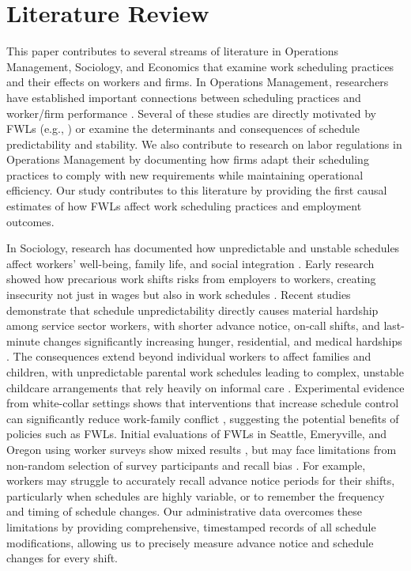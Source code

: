 \documentclass[letterpaper,11pt,leqno]{article}
\theoremstyle{paper}
\begin{document}
\section{Literature Review} \label{sec:literature_review}
This paper contributes to several streams of literature in Operations Management, Sociology, and Economics that examine work scheduling practices and their effects on workers and firms. In Operations Management, researchers have established important connections between scheduling practices and worker/firm performance \citep{fisher_2021, netessine_traffic, kesavan_traffic, call_of_duty_2021, du_scheduling, fisher_raman_2010, kwon2024employee, kwon_hci, retailAIScheduling2025, kwon2025inputinaccuracy, kwon2023inconsistentschedules}. Several of these studies are directly motivated by FWLs (e.g., \cite{du_scheduling}) or examine the determinants and consequences of schedule predictability and stability. We also contribute to research on labor regulations in Operations Management \citep{Asadpour2022MinimumEarnings, KwonWu2021Disclosure, Lu2017DoMandatory, min_wage_yiu} by documenting how firms adapt their scheduling practices to comply with new requirements while maintaining operational efficiency. Our study contributes to this literature by providing the first causal estimates of how FWLs affect work scheduling practices and employment outcomes.

In Sociology, research has documented how unpredictable and unstable schedules affect workers' well-being, family life, and social integration \citep{kalleberg2009precarious,schneider2019consequences}. Early research showed how precarious work shifts risks from employers to workers, creating insecurity not just in wages but also in work schedules \citep{kalleberg2000nonstandard}. Recent studies demonstrate that schedule unpredictability directly causes material hardship among service sector workers, with shorter advance notice, on-call shifts, and last-minute changes significantly increasing hunger, residential, and medical hardships \citep{schneider2021hard}. The consequences extend beyond individual workers to affect families and children, with unpredictable parental work schedules leading to complex, unstable childcare arrangements that rely heavily on informal care \citep{harknett2022who}. Experimental evidence from white-collar settings shows that interventions that increase schedule control can significantly reduce work-family conflict \citep{kelly2011changing}, suggesting the potential benefits of policies such as FWLs. Initial evaluations of FWLs in Seattle, Emeryville, and Oregon using worker surveys show mixed results \citep{seattle_pp,ananant_emeryville,fw_unintended,haley_lock}, but may face limitations from non-random selection of survey participants and recall bias \citep{bound2001measurement}. For example, workers may struggle to accurately recall advance notice periods for their shifts, particularly when schedules are highly variable, or to remember the frequency and timing of schedule changes. Our administrative data overcomes these limitations by providing comprehensive, timestamped records of all schedule modifications, allowing us to precisely measure advance notice and schedule changes for every shift.
\end{document}
